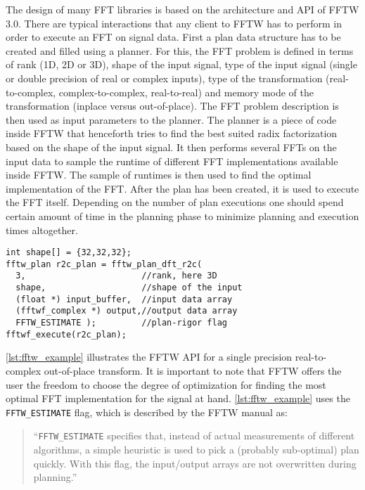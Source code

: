 \label{ssec:modern_ffts}
The design of many FFT libraries is based on the architecture and API of FFTW $3.0$. There are typical interactions that any client to FFTW has to perform in order to execute an FFT on signal data. First a plan data structure has to be created and filled using a planner. For this, the FFT problem is defined in terms of rank (1D, 2D or 3D), shape of the input signal, type of the input signal (single or double precision of real or complex inputs), type of the transformation (real-to-complex, complex-to-complex, real-to-real) and memory mode of the transformation (inplace versus out-of-place). The FFT problem description is then used as input parameters to the planner. The planner is a piece of code inside FFTW that henceforth tries to find the best suited radix factorization based on the shape of the input signal. It then performs several FFTs on the input data to sample the runtime of different FFT implementations available inside FFTW. The sample of runtimes is then used to find the optimal implementation of the FFT. After the plan has been created, it is used to execute the FFT itself.
Depending on the number of plan executions one should spend certain amount of time in the planning phase to minimize planning and execution times altogether.
\begin{lstlisting}[caption={Minimal usage example of the FFTW single precision real-to-complex planner API. Memory management is omitted.},label={lst:fftw_example}]
int shape[] = {32,32,32};
fftw_plan r2c_plan = fftw_plan_dft_r2c(
  3,                       //rank, here 3D
  shape,                   //shape of the input
  (float *) input_buffer,  //input data array
  (fftwf_complex *) output,//output data array
  FFTW_ESTIMATE );         //plan-rigor flag
fftwf_execute(r2c_plan);
\end{lstlisting}
\cref{lst:fftw_example} illustrates the FFTW API for a single precision real-to-complex out-of-place transform. It is important to note that FFTW offers the user the freedom to choose the degree of optimization for finding the most optimal FFT implementation for the signal at hand. \cref{lst:fftw_example} uses the \texttt{FFTW\_ESTIMATE} flag, which is described by the FFTW manual \cite{fftw_manual} as:
%
\begin{quote}
``\texttt{FFTW\_ESTIMATE} specifies that, instead of actual measurements of different algorithms, a simple heuristic is used to pick a (probably sub-optimal) plan quickly. With this flag, the input/output arrays are not overwritten during planning.''
\end{quote}
